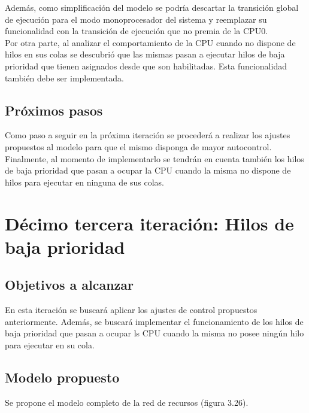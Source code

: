 \documentclass[a4paper]{book}
\begin{document}
Adem\'as, como simplificaci\'on del modelo se podr\'ia descartar la transici\'on global de ejecuci\'on para el modo monoprocesador del sistema y reemplazar su funcionalidad con la transici\'on de ejecuci\'on que no premia de la CPU0.\\

Por otra parte, al analizar el comportamiento de la CPU cuando no dispone de hilos en sus colas se descubri\'o que las mismas pasan a ejecutar hilos de baja prioridad que tienen asignados desde que son habilitadas. Esta funcionalidad tambi\'en debe ser implementada.

\subsection{Pr\'oximos pasos}
Como paso a seguir en la pr\'oxima iteraci\'on se proceder\'a a realizar los ajustes propuestos al modelo para que el mismo disponga de mayor autocontrol.\\

Finalmente, al momento de implementarlo se tendr\'an en cuenta tambi\'en los hilos de baja prioridad que pasan a ocupar la CPU cuando la misma no dispone de hilos para ejecutar en ninguna de sus colas.


\newpage
\section{D\'ecimo tercera iteraci\'on: Hilos de baja prioridad}

\subsection{Objetivos a alcanzar}
En esta iteraci\'on se buscar\'a aplicar los ajustes de control propuestos anteriormente. Adem\'as, se buscar\'a implementar el funcionamiento de los hilos de baja prioridad que pasan a ocupar ls CPU cuando la misma no posee ning\'un hilo para ejecutar en su cola.

\subsection{Modelo propuesto}
Se propone el modelo completo de la red de recursos (figura 3.26).
\end{document}
